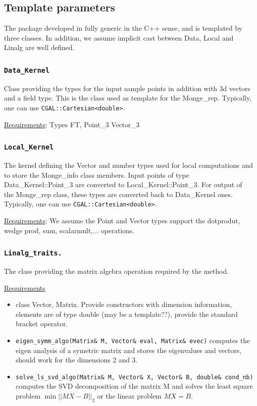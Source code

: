 \subsection{Template parameters}

The package developed in fully generic in the C++ sense, and is
templated by three classes. In addition, we assume implicit cast
between Data, Local and Linalg are well defined.

\subsubsection{\tt Data\_Kernel} 
Class providing the types for the input sample points in addition with 
3d vectors and a field type. This is the class used as template for
the Monge\_rep. 
Typically, one can use {\tt CGAL::Cartesian<double>}.

\noindent \underline{Requirements}: Types FT, Point\_3 Vector\_3

\subsubsection{\tt Local\_Kernel}
The kernel defining the Vector and number types used for local
computations and to store the Monge\_info class members. Input points
of type Data\_Kernel::Point\_3 are converted to
Local\_Kernel::Point\_3. For output of the Monge\_rep class, these
types are converted back to Data\_Kernel ones.  Typically, one can use
{\tt CGAL::Cartesian<double>}.

\noindent \underline{Requirements}:  We assume the Point and Vector
types support the dotprodut, wedge prod, sum,
scalarmult,... operations.

\subsubsection{\tt Linalg\_traits.} 
The class providing the matrix algebra operation required by the
method.

\noindent \underline{Requirements} 

\begin{itemize}
\item 
class Vector, Matrix.  Provide constructors with dimension
information, elements are of type double (may be a template??),
provide the standard bracket operator.
\item 
{\tt eigen\_symm\_algo(Matrix\& M, Vector\& eval, Matrix\& evec)} computes
the eigen analysis of a symetric matrix and stores the eigenvalues and 
vectors, should work for the dimensions 2 and 3.
\item
{\tt solve\_ls\_svd\_algo(Matrix\& M, Vector\& X, Vector\& B, double\&
cond\_nb)} computes the SVD decomposition of the matrix M and solves
the least square problem $\min ||MX-B||_2$ or the linear problem
$MX=B$.
\end{itemize}



